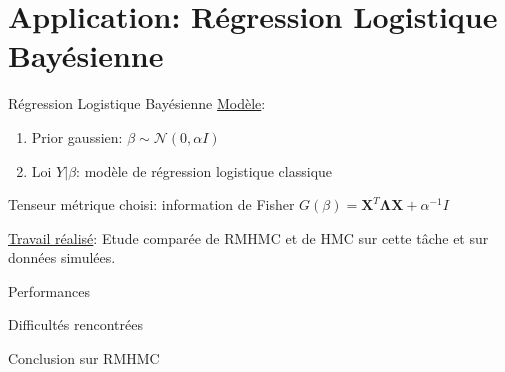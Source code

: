 \documentclass{beamer}
\begin{document}
  \section{Application: Régression Logistique Bayésienne}
  \begin{frame}{Régression Logistique Bayésienne}
	\underline{Modèle}: 
	\begin{enumerate}
	\item Prior gaussien: $ \beta \sim \mathcal{N}(0,\alpha I) $
	\item Loi $Y|\beta$: modèle de régression logistique classique
\end{enumerate}	  
  
  	Tenseur métrique choisi: information de Fisher $G(\beta)=\bm{X}^T\bm{\Lambda}\bm{X}+\alpha^{-1}I$
  	
  	\underline{Travail réalisé}: Etude comparée de RMHMC et de HMC sur cette tâche et sur données simulées.
  \end{frame}


\begin{frame}{Performances}

\end{frame}


\begin{frame}{Difficultés rencontrées}

\end{frame}

\begin{frame}{Conclusion sur RMHMC}

\end{frame}
  \begin{frame}
  
  
  \end{frame}

  
\end{document}
